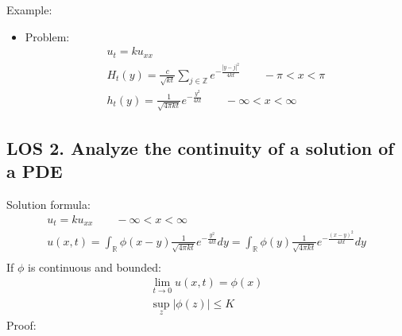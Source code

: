 \documentclass[12pt, a4paper]{article}
\begin{document}
Example:
\begin{itemize}
    \item Problem:
    \begin{gather*}
        u_t = ku_{xx} \\
        H_t(y) = \frac{c}{\sqrt{kt}}\sum_{j\in\mathbb{Z}}e^{-\frac{|y-j|^2}{4kt}}\qquad -\pi < x < \pi \\
        h_t(y) = \frac{1}{\sqrt{4\pi kt}}e^{-\frac{y^2}{4kt}}\qquad -\infty < x < \infty 
    \end{gather*}
\end{itemize}
\vspace{0.3em}

\subsection*{LOS 2. Analyze the continuity of a solution of a PDE}
Solution formula:
\begin{gather*}
    u_t = ku_{xx} \qquad -\infty < x < \infty\\
    u(x, t) = \int_{\mathbb{R}} \phi(x-y) \frac{1}{\sqrt{4\pi kt}}e^{-\frac{y^2}{4kt}}dy = \int_{\mathbb{R}} \phi(y) \frac{1}{\sqrt{4\pi kt}}e^{-\frac{(x-y)^2}{4kt}}dy\\
\end{gather*}
If $\phi$ is continuous and bounded:
\begin{gather*}
    \lim_{t \to 0} u(x, t) = \phi(x)\\
    \sup_z |\phi(z)| \leq K
\end{gather*}
Proof:
\end{document}
